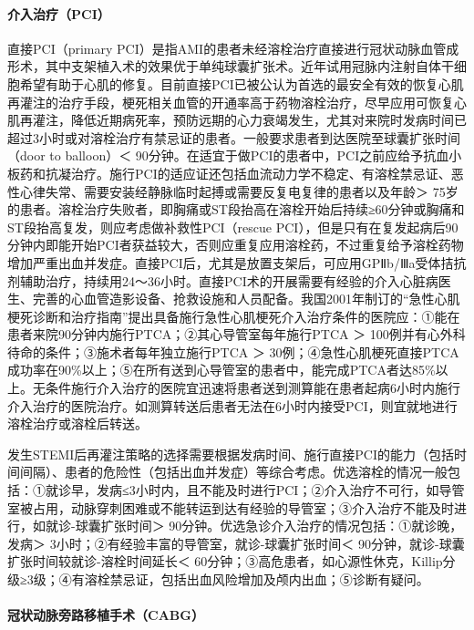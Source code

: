 \paragraph{介入治疗（PCI）}

直接PCI（primary
PCI）是指AMI的患者未经溶栓治疗直接进行冠状动脉血管成形术，其中支架植入术的效果优于单纯球囊扩张术。近年试用冠脉内注射自体干细胞希望有助于心肌的修复。目前直接PCI已被公认为首选的最安全有效的恢复心肌再灌注的治疗手段，梗死相关血管的开通率高于药物溶栓治疗，尽早应用可恢复心肌再灌注，降低近期病死率，预防远期的心力衰竭发生，尤其对来院时发病时间已超过3小时或对溶栓治疗有禁忌证的患者。一般要求患者到达医院至球囊扩张时间（door
to balloon）＜
90分钟。在适宜于做PCI的患者中，PCI之前应给予抗血小板药和抗凝治疗。施行PCI的适应证还包括血流动力学不稳定、有溶栓禁忌证、恶性心律失常、需要安装经静脉临时起搏或需要反复电复律的患者以及年龄＞
75岁的患者。溶栓治疗失败者，即胸痛或ST段抬高在溶栓开始后持续≥60分钟或胸痛和ST段抬高复发，则应考虑做补救性PCI（rescue
PCI），但是只有在复发起病后90分钟内即能开始PCI者获益较大，否则应重复应用溶栓药，不过重复给予溶栓药物增加严重出血并发症。直接PCI后，尤其是放置支架后，可应用GPⅡb/Ⅲa受体拮抗剂辅助治疗，持续用24～36小时。直接PCI术的开展需要有经验的介入心脏病医生、完善的心血管造影设备、抢救设施和人员配备。我国2001年制订的“急性心肌梗死诊断和治疗指南”提出具备施行急性心肌梗死介入治疗条件的医院应：①能在患者来院90分钟内施行PTCA；②其心导管室每年施行PTCA
＞ 100例并有心外科待命的条件；③施术者每年独立施行PTCA ＞
30例；④急性心肌梗死直接PTCA成功率在90\%以上；⑤在所有送到心导管室的患者中，能完成PTCA者达85\%以上。无条件施行介入治疗的医院宜迅速将患者送到测算能在患者起病6小时内施行介入治疗的医院治疗。如测算转送后患者无法在6小时内接受PCI，则宜就地进行溶栓治疗或溶栓后转送。

发生STEMI后再灌注策略的选择需要根据发病时间、施行直接PCI的能力（包括时间间隔）、患者的危险性（包括出血并发症）等综合考虑。优选溶栓的情况一般包括：①就诊早，发病≤3小时内，且不能及时进行PCI；②介入治疗不可行，如导管室被占用，动脉穿刺困难或不能转运到达有经验的导管室；③介入治疗不能及时进行，如就诊-球囊扩张时间＞
90分钟。优选急诊介入治疗的情况包括：①就诊晚，发病＞
3小时；②有经验丰富的导管室，就诊-球囊扩张时间＜
90分钟，就诊-球囊扩张时间较就诊-溶栓时间延长＜
60分钟；③高危患者，如心源性休克，Killip分级≥3级；④有溶栓禁忌证，包括出血风险增加及颅内出血；⑤诊断有疑问。

\paragraph{冠状动脉旁路移植手术（CABG）}

